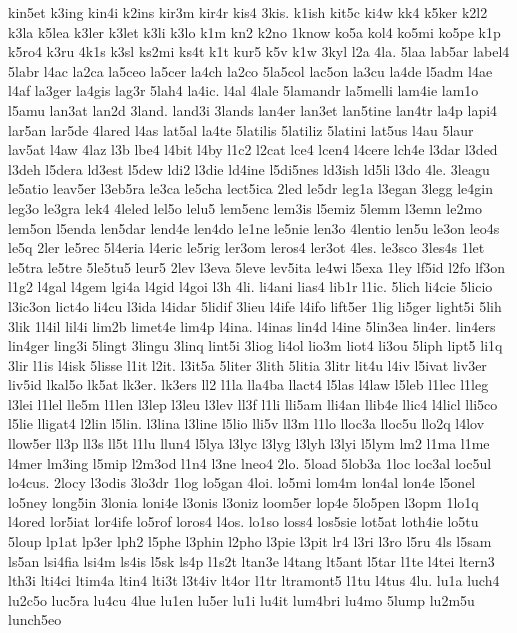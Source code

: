 {kin5et
k3ing
kin4i
k2ins
kir3m
kir4r
kis4
3kis.
k1ish
kit5c
ki4w
kk4
k5ker
k2l2
k3la
k5lea
k3ler
k3let
k3li
k3lo
k1m
kn2
k2no
1know
ko5a
kol4
ko5mi
ko5pe
k1p
k5ro4
k3ru
4k1s
k3sl
ks2mi
ks4t
k1t
kur5
k5v
k1w
3kyl
l2a
4la.
5laa
lab5ar
label4
5labr
l4ac
la2ca
la5ceo
la5cer
la4ch
la2co
5la5col
lac5on
la3cu
la4de
l5adm
l4ae
l4af
la3ger
la4gis
lag3r
5lah4
la4ic.
l4al
4lale
5lamandr
la5melli
lam4ie
lam1o
l5amu
lan3at
lan2d
3land.
land3i
3lands
lan4er
lan3et
lan5tine
lan4tr
la4p
lapi4
lar5an
lar5de
4lared
l4as
lat5al
la4te
5latilis
5latiliz
5latini
lat5us
l4au
5laur
lav5at
l4aw
4laz
l3b
lbe4
l4bit
l4by
l1c2
l2cat
lce4
lcen4
l4cere
lch4e
l3dar
l3ded
l3deh
l5dera
ld3est
l5dew
ldi2
l3die
ld4ine
l5di5nes
ld3ish
ld5li
l3do
4le.
3leagu
le5atio
leav5er
l3eb5ra
le3ca
le5cha
lect5ica
2led
le5dr
leg1a
l3egan
3legg
le4gin
leg3o
le3gra
lek4
4leled
lel5o
lelu5
lem5enc
lem3is
l5emiz
5lemm
l3emn
le2mo
lem5on
l5enda
len5dar
lend4e
len4do
le1ne
le5nie
len3o
4lentio
len5u
le3on
leo4s
le5q
2ler
le5rec
5l4eria
l4eric
le5rig
ler3om
leros4
ler3ot
4les.
le3sco
3les4s
1let
le5tra
le5tre
5le5tu5
leur5
2lev
l3eva
5leve
lev5ita
le4wi
l5exa
1ley
lf5id
l2fo
lf3on
l1g2
l4gal
l4gem
lgi4a
l4gid
l4goi
l3h
4li.
li4ani
lias4
lib1r
l1ic.
5lich
li4cie
5licio
l3ic3on
lict4o
li4cu
l3ida
l4idar
5lidif
3lieu
l4ife
l4ifo
lift5er
1lig
li5ger
light5i
5lih
3lik
1l4il
lil4i
lim2b
limet4e
lim4p
l4ina.
l4inas
lin4d
l4ine
5lin3ea
lin4er.
lin4ers
lin4ger
ling3i
5lingt
3lingu
3linq
lint5i
3liog
li4ol
lio3m
liot4
li3ou
5liph
lipt5
li1q
3lir
l1is
l4isk
5lisse
l1it
l2it.
l3it5a
5liter
3lith
5litia
3litr
lit4u
l4iv
l5ivat
liv3er
liv5id
lkal5o
lk5at
lk3er.
lk3ers
ll2
l1la
lla4ba
llact4
l5las
l4law
l5leb
l1lec
l1leg
l3lei
l1lel
lle5m
l1len
l3lep
l3leu
l3lev
ll3f
l1li
lli5am
lli4an
llib4e
llic4
l4licl
lli5co
l5lie
lligat4
l2lin
l5lin.
l3lina
l3line
l5lio
lli5v
ll3m
l1lo
lloc3a
lloc5u
llo2q
l4lov
llow5er
ll3p
ll3s
ll5t
l1lu
llun4
l5lya
l3lyc
l3lyg
l3lyh
l3lyi
l5lym
lm2
l1ma
l1me
l4mer
lm3ing
l5mip
l2m3od
l1n4
l3ne
lneo4
2lo.
5load
5lob3a
1loc
loc3al
loc5ul
lo4cus.
2locy
l3odis
3lo3dr
1log
lo5gan
4loi.
lo5mi
lom4m
lon4al
lon4e
l5onel
lo5ney
long5in
3lonia
loni4e
l3onis
l3oniz
loom5er
lop4e
5lo5pen
l3opm
1lo1q
l4ored
lor5iat
lor4ife
lo5rof
loros4
l4os.
lo1so
loss4
los5sie
lot5at
loth4ie
lo5tu
5loup
lp1at
lp3er
lph2
l5phe
l3phin
l2pho
l3pie
l3pit
lr4
l3ri
l3ro
l5ru
4ls
l5sam
ls5an
lsi4fia
lsi4m
ls4is
l5sk
ls4p
l1s2t
ltan3e
l4tang
lt5ant
l5tar
l1te
l4tei
ltern3
lth3i
lti4ci
ltim4a
ltin4
lti3t
l3t4iv
lt4or
l1tr
ltramont5
l1tu
l4tus
4lu.
lu1a
luch4
lu2c5o
luc5ra
lu4cu
4lue
lu1en
lu5er
lu1i
lu4it
lum4bri
lu4mo
5lump
lu2m5u
lunch5eo
}
